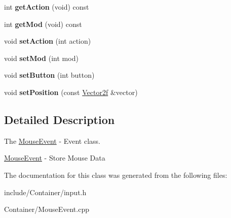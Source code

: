 \begin{DoxyCompactItemize}
\item 
\hypertarget{classEngine_1_1MouseEvent_ad554b256e40f0bd4b7916812e52e17d8}{}int {\bfseries get\+Action} (void) const \label{classEngine_1_1MouseEvent_ad554b256e40f0bd4b7916812e52e17d8}

\item 
\hypertarget{classEngine_1_1MouseEvent_a583266eb9e5d5edce1c878f7c5f3c95c}{}int {\bfseries get\+Mod} (void) const \label{classEngine_1_1MouseEvent_a583266eb9e5d5edce1c878f7c5f3c95c}

\item 
\hypertarget{classEngine_1_1MouseEvent_a49b18f49460d7a398291798478753c42}{}void {\bfseries set\+Action} (int action)\label{classEngine_1_1MouseEvent_a49b18f49460d7a398291798478753c42}

\item 
\hypertarget{classEngine_1_1MouseEvent_a0cee4b15ce7f60e2f85dfc5140efd2c0}{}void {\bfseries set\+Mod} (int mod)\label{classEngine_1_1MouseEvent_a0cee4b15ce7f60e2f85dfc5140efd2c0}

\item 
\hypertarget{classEngine_1_1MouseEvent_a1783ed646cf5a2b9c0984bfce3a8cc89}{}void {\bfseries set\+Button} (int button)\label{classEngine_1_1MouseEvent_a1783ed646cf5a2b9c0984bfce3a8cc89}

\item 
\hypertarget{classEngine_1_1MouseEvent_a4f06d2de67e734d62c6b3f9ee2d3396d}{}void {\bfseries set\+Position} (const \hyperlink{classVector2}{Vector2f} \&vector)\label{classEngine_1_1MouseEvent_a4f06d2de67e734d62c6b3f9ee2d3396d}

\end{DoxyCompactItemize}


\subsection{Detailed Description}
The \hyperlink{classEngine_1_1MouseEvent}{Mouse\+Event} -\/ Event class. 

\hyperlink{classEngine_1_1MouseEvent}{Mouse\+Event} -\/ Store Mouse Data 

The documentation for this class was generated from the following files\+:\begin{DoxyCompactItemize}
\item 
include/\+Container/input.\+h\item 
Container/Mouse\+Event.\+cpp\end{DoxyCompactItemize}
